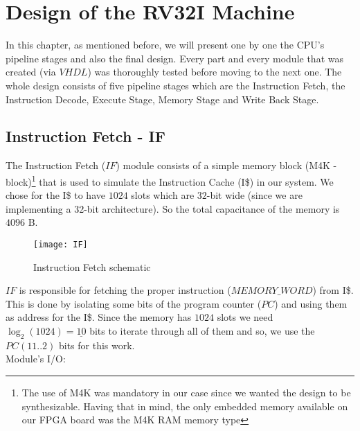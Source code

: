 \chapter{Design of the RV32I Machine}
	\minitoc
	\vspace{5mm}
	In this chapter, as mentioned before, we will present one by one the CPU's pipeline stages and also the final design. Every part and every module that was created (via $VHDL$) was thoroughly tested before moving to the next one. The whole design consists of five pipeline stages which are the Instruction Fetch, the Instruction Decode, Execute Stage, Memory Stage and Write Back Stage. 
	\clearpage
	\section{Instruction Fetch - IF}
	 \label{Instruction Fetch}
	 The Instruction Fetch ($IF$) module consists of a simple memory block (M4K - block)\footnote{The use of M4K was mandatory in our case since we wanted the design to be synthesizable. Having that in mind, the only embedded memory available on our FPGA board was the M4K RAM memory type } that is used to simulate the Instruction Cache (I\$) in our system. 
	 We chose for the I\$ to have $1024$ slots which are $32$-bit wide (since we are implementing a 32-bit architecture). So the total capacitance of the memory is $4096$ B. 
	 
	 \begin{figure}[h!]
	 	\begin{center}
	 		\texttt{[image: IF]}
	 		\caption{Instruction Fetch schematic}
	 		\label{Image3.1}
	 	\end{center}
	 \end{figure}
 
	 $IF$ is responsible for fetching the proper instruction ($MEMORY\_WORD$) from I\$. This is done by isolating some bits of the program counter ($PC$) and using them as address for the I\$. Since the memory has $1024$ slots we need $\log_2(1024)=\underline{10}$ bits to iterate through all of them and so, we use the $PC(11..2)$ bits for this work. \\
	 Module's I/O:	  
	
